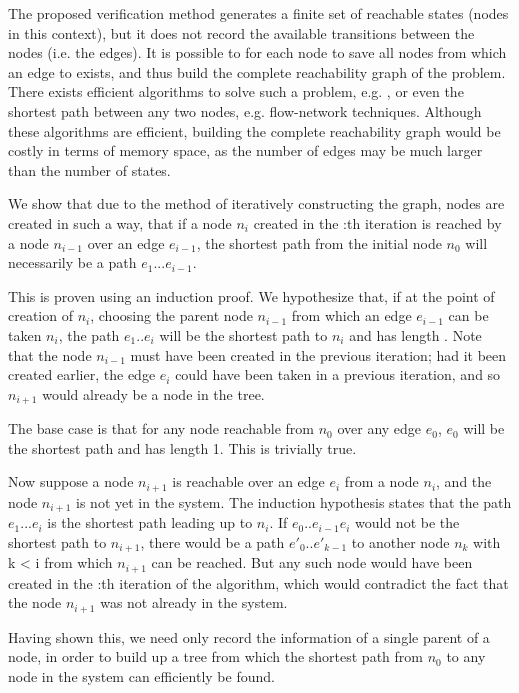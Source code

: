 The proposed verification method generates a finite set of reachable states (nodes in this context), but it does not record the available transitions between the nodes (i.e. the edges). It is possible to for each node  to save all nodes  from which an edge to  exists, and thus build the complete reachability graph of the problem. There exists efficient algorithms to solve such a problem, e.g. , or even the shortest path between any two nodes, e.g. flow-network techniques. Although these algorithms are efficient, building the complete reachability graph would be costly in terms of memory space, as the number of edges may be much larger than the number of states.

 
We show that due to the method of iteratively constructing the graph, nodes are created in such a way, that if a node $n_{i}$ created in the :th iteration is reached by a node $n_{i-1}$ over an edge $e_{i-1}$, the shortest path from the initial node $n_0$ will necessarily be a path $e_1...e_{i-1}$.
 
 This is proven using an induction proof. We hypothesize that, if at the point of creation of $n_i$, choosing the parent node $n_{i-1}$ from which an edge $e_{i-1}$ can be taken $n_i$, the path $e_1..e_{i}$ will be the shortest path to $n_i$ and has length . Note that the node $n_{i-1}$ must have been created in the previous iteration; had it been created earlier, the edge $e_i$ could have been taken in a previous iteration, and so $n_{i+1}$ would already be a node in the tree.
 
The base case is that for any node reachable from $n_0$ over any edge $e_0$, $e_0$ will be the shortest path and has length 1. This is trivially true.
 
Now suppose a node $n_{i+1}$ is reachable over an edge $e_i$ from a node $n_i$, and the node $n_{i+1}$ is not yet in the system. The induction hypothesis states that the path $e_1...e_i$ is the shortest path leading up to $n_i$. If $e_0..e_{i-1}e_i$ would not be the shortest path to $n_{i+1}$, there would be a path $e'_0..e'_{k-1}$ to another node $n_k$ with k < i from which $n_{i+1}$ can be reached. But any such node would have been created in the :th iteration of the algorithm, which would contradict the fact that the node $n_{i+1}$ was not already in the system.
 
Having shown this, we need only record the information of a single parent of a node, in order to build up a tree from which the shortest path from $n_0$ to any node in the system can efficiently be found.

\swreceiver

\swobserver

\swsender
